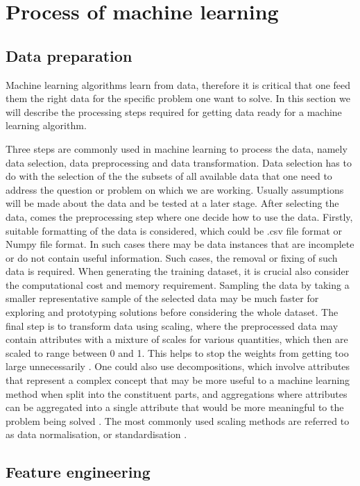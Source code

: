 \section{Process of machine learning}
\label{Process}
\subsection{Data preparation}
Machine learning algorithms learn from data, therefore it is critical that one feed them the right data for the specific problem one want to solve. In this section we will describe the processing steps required for getting data ready for a machine learning algorithm.

Three steps are commonly used in machine learning to process the data, namely data selection, data preprocessing  and data transformation. Data selection has to do with the selection of the the subsets of all available data that one need to address the question or problem on which we are working. Usually assumptions will be made  about the data and be tested at a later stage. After selecting the data, comes the preprocessing step where one decide how to use the data. Firstly, suitable formatting of the data is considered, which could be .csv file format or Numpy file format. In such cases there may be data instances that are incomplete or do not contain useful information. Such cases, the removal or fixing of such data is required. When generating the training dataset, it is crucial  also consider the computational cost and memory requirement. Sampling the data by taking a smaller representative sample of the selected data may be much faster for exploring and prototyping solutions before considering the whole dataset. The final step is to transform data using scaling, where the preprocessed data may contain attributes with a mixture of scales for various quantities, which then are scaled to range between 0 and 1. This helps to stop the weights from getting too large unnecessarily \citep{marsland2015machine}. One could also use decompositions, which involve attributes that represent a complex concept that may be more useful to a machine learning method when split into the constituent parts, and  aggregations where attributes can be aggregated into a single attribute that would be more meaningful to the problem being solved \citep{brownlee2013prepare}. The most commonly used scaling methods are referred to as data normalisation, or standardisation \citep{marsland2015machine}.
    
\subsection{Feature engineering}

